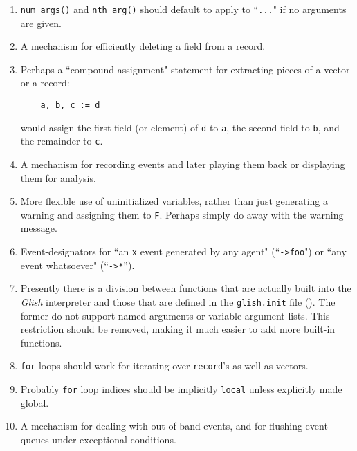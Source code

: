 \begin{enumerate}
\item {\tt num\_args()} and {\tt nth\_arg()} should default to
apply to ``{\tt ...}" if no arguments are given.

\item A mechanism
for efficiently deleting a field from a record.

\item Perhaps a
``compound-assignment" statement for extracting pieces
of a vector or a record:
\begin{verbatim}
    a, b, c := d
\end{verbatim}
would assign the first field (or element) of {\tt d} to {\tt a}, the
second field to {\tt b}, and the remainder to {\tt c}.

\item A mechanism for
recording events and later playing them back
or displaying them for analysis.

\item More
flexible use of uninitialized variables, rather than just
generating a warning and assigning them to {\tt F}.  Perhaps simply
do away with the warning message.

\item Event-designators
for ``an {\tt x} event generated by any agent"
(``{\tt *->foo}") or ``any event whatsoever" (``{\tt *->*}'').

\item Presently there is a division between functions that are
actually built into the {\em Glish} interpreter and those that are defined
in the {\tt glish.init} file ().  The former do
not support named arguments or variable argument lists.  This restriction
should be removed, making it much easier to add more
built-in functions.

\item {\tt for} loops should work for iterating over {\tt record}'s as
well as vectors.

\item Probably {\tt for} loop indices should be implicitly {\tt local}
unless explicitly made global.

\item A mechanism for
dealing with out-of-band events, and for
flushing event queues under exceptional conditions.


\end{enumerate}
